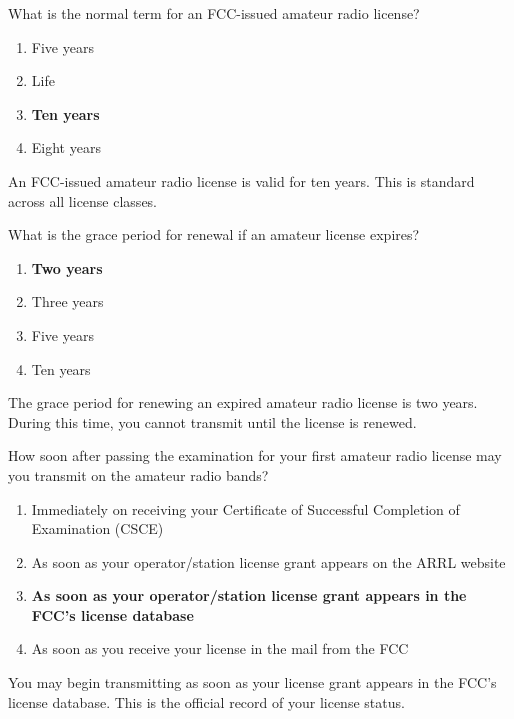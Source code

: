 \begin{tcolorbox}[colback=gray!10!white,colframe=black!75!black,title={T1C08}]
    What is the normal term for an FCC-issued amateur radio license?
    \begin{enumerate}[label=\Alph*),noitemsep]
        \item Five years
        \item Life
        \item \textbf{Ten years}
        \item Eight years
    \end{enumerate}
\end{tcolorbox}
An FCC-issued amateur radio license is valid for ten years. This is standard across all license classes.


\begin{tcolorbox}[colback=gray!10!white,colframe=black!75!black,title={T1C09}]
    What is the grace period for renewal if an amateur license expires?
    \begin{enumerate}[label=\Alph*),noitemsep]
        \item \textbf{Two years}
        \item Three years
        \item Five years
        \item Ten years
    \end{enumerate}
\end{tcolorbox}
The grace period for renewing an expired amateur radio license is two years. During this time, you cannot transmit until the license is renewed.


\begin{tcolorbox}[colback=gray!10!white,colframe=black!75!black,title={T1C10}]
    How soon after passing the examination for your first amateur radio license may you transmit on the amateur radio bands?
    \begin{enumerate}[label=\Alph*),noitemsep]
        \item Immediately on receiving your Certificate of Successful Completion of Examination (CSCE)
        \item As soon as your operator/station license grant appears on the ARRL website
        \item \textbf{As soon as your operator/station license grant appears in the FCC’s license database}
        \item As soon as you receive your license in the mail from the FCC
    \end{enumerate}
\end{tcolorbox}
You may begin transmitting as soon as your license grant appears in the FCC’s license database. This is the official record of your license status.

